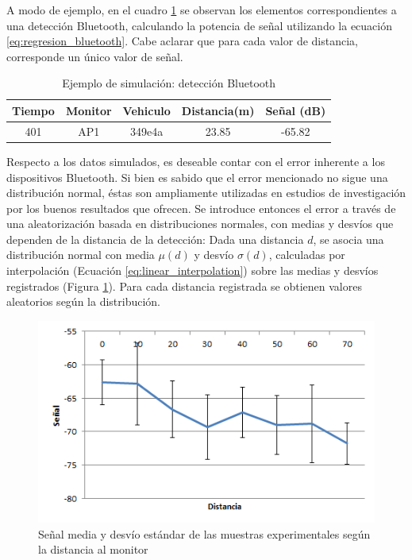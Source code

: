  A modo de ejemplo, en el cuadro \ref{tbl:bluetooth-data} se observan los elementos correspondientes a una detección Bluetooth, calculando la potencia de señal utilizando la ecuación \ref{eq:regresion_bluetooth}. Cabe aclarar que para cada valor de distancia, corresponde un único valor de señal.

\begin{table}[h]
\centering
\begin{tabular}{|c|c|c|c|c|}
\hline
Tiempo & Monitor & Vehiculo & Distancia(m) & Señal (dB)\\
\hline
401 & AP1 & 349e4a & 23.85 & -65.82\\
\hline
\end{tabular}
\caption{Ejemplo de simulación: detección Bluetooth}
\label{tbl:bluetooth-data}
\end{table}

Respecto a los datos simulados, es deseable contar con el error inherente a los dispositivos Bluetooth. Si bien es sabido que el error mencionado no sigue una distribución normal, éstas son ampliamente utilizadas en estudios de investigación por los buenos resultados que ofrecen\cite{cinefra2014adaptive}. Se introduce entonces el error a través de una aleatorización basada en distribuciones normales, con medias y desvíos que dependen de la distancia de la detección: Dada una distancia $d$, se asocia una distribución normal con media $\mu(d)$ y desvío $\sigma(d)$, calculadas por interpolación (Ecuación \ref{eq:linear_interpolation}) sobre las medias y desvíos registrados (Figura \ref{fig:medias-desvios}). Para cada distancia registrada se obtienen valores aleatorios según la distribución.

\begin{figure}[!htp]
	\centering
	\includegraphics[scale=0.35]{images/medias_y_desvios.png}
	\captionsetup{width=0.6\textwidth}
	\caption{Señal media y desvío estándar de las muestras experimentales según la distancia al monitor}
    \label{fig:medias-desvios}
\end{figure}

